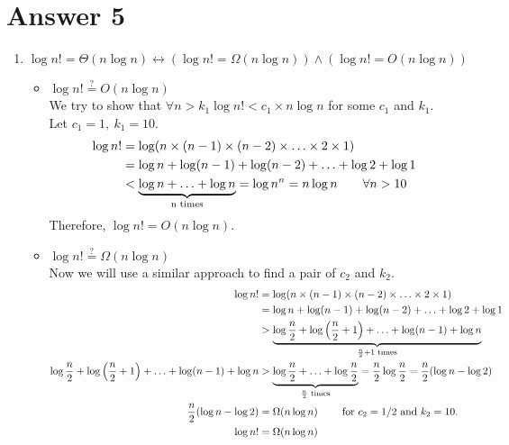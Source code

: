 \documentclass[11pt]{article}
\begin{document}
\section*{Answer 5}
\begin{enumerate}[label=\textbf{\alph*)}]
	\item $\log n! = \Theta(n\log n) \leftrightarrow (\log n! = 
		\Omega(n\log n)) \land (\log n! = O(n\log n))$
	\begin{itemize}
	\item $\log n! \stackrel{?}{=} O(n\log n)$\\

		We try to show that $\forall n > k_1 \log n! < c_1 \times n\log n$ for some $c_1$ and $k_1$.\\
		Let $c_1 = 1,\ k_1 = 10$.\\ 
		\begin{align*}
			\log n! &= \log (n \times (n-1) \times (n-2) \times \mathellipsis \times 2 \times 1) \\
			&= \log n + \log (n-1) + \log (n-2) + \mathellipsis + \log2 + \log1\\
			&< \underbrace{\log n + \mathellipsis + \log n}_{\text{n times}}=\log n^n= n\log n\qquad \forall n>10\\
		\end{align*}
			Therefore, $\log n! = O(n\log n).$\\
	\item $\log n! \stackrel{?}{=} \Omega(n\log n)$\\

		Now we will use a similar approach to find a pair of $c_2$ and $k_2$.\\

		\begin{align*}
			\log n! &= \log (n \times (n-1) \times (n-2) \times \mathellipsis \times 2 \times 1) \\
			&= \log n + \log (n-1) + \log (n-2) + \mathellipsis + \log2 + \log1\\
			&> \underbrace{\log\frac{n}{2} + \log\left(\frac{n}{2}+1\right) + \mathellipsis + \log(n-1) + \log n}_{\frac{n}{2}+1 \text{ times}}\\
			\log\frac{n}{2} + \log\left(\frac{n}{2}+1\right) + \mathellipsis + \log(n-1) + \log n &>  \underbrace{\log\frac{n}{2}+\mathellipsis+\log\frac{n}{2}}_{\frac{n}{2} \text{ times}} = \frac{n}{2}\log\frac{n}{2} = \frac{n}{2}(\log n - \log2)\\
			\frac{n}{2}(\log n - \log2) &= \Omega(n\log n)\qquad \text{ for $c_2 = 1/2$ and $k_2 = 10$.}\\
			\log n! &= \Omega(n\log n)
		\end{align*}


\end{itemize}
\end{enumerate}
\end{document}
